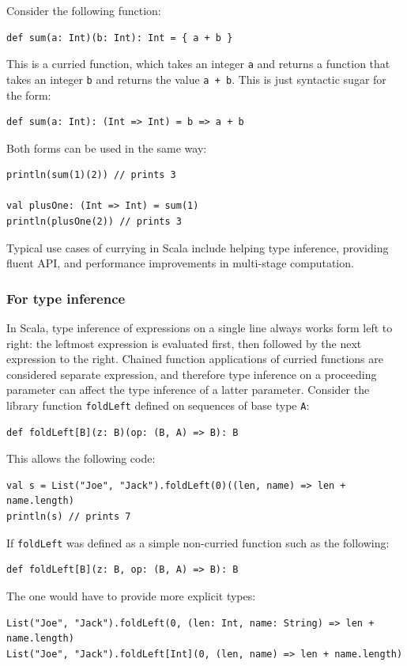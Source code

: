 Consider the following function:
\begin{lstlisting}
def sum(a: Int)(b: Int): Int = { a + b }
\end{lstlisting}
This is a curried function, which takes an integer \texttt{a} and returns a function that takes an integer \texttt{b} and returns the value \texttt{a + b}. This is just syntactic sugar for the form:
\begin{lstlisting}
def sum(a: Int): (Int => Int) = b => a + b
\end{lstlisting}
Both forms can be used in the same way:
\begin{lstlisting}
println(sum(1)(2)) // prints 3

val plusOne: (Int => Int) = sum(1)
println(plusOne(2)) // prints 3
\end{lstlisting}

Typical use cases of currying in Scala include helping type inference, providing fluent API, and performance improvements in multi-stage computation.

\subsubsection{For type inference}

In Scala, type inference of expressions on a single line always works form left to right: the leftmost expression is evaluated first, then followed by the next expression to the right. Chained function applications of curried functions are considered separate expression, and therefore type inference on a proceeding parameter can affect the type inference of a latter parameter. Consider the library function \texttt{foldLeft} defined on sequences of base type \texttt{A}:
\begin{lstlisting}
def foldLeft[B](z: B)(op: (B, A) => B): B
\end{lstlisting}
This allows the following code:
\begin{lstlisting}
val s = List("Joe", "Jack").foldLeft(0)((len, name) => len + name.length)
println(s) // prints 7
\end{lstlisting}
If \texttt{foldLeft} was defined as a simple non-curried function such as the following:
\begin{lstlisting}
def foldLeft[B](z: B, op: (B, A) => B): B
\end{lstlisting}
The one would have to provide more explicit types:
\begin{lstlisting}
List("Joe", "Jack").foldLeft(0, (len: Int, name: String) => len + name.length)
List("Joe", "Jack").foldLeft[Int](0, (len, name) => len + name.length)
\end{lstlisting}

